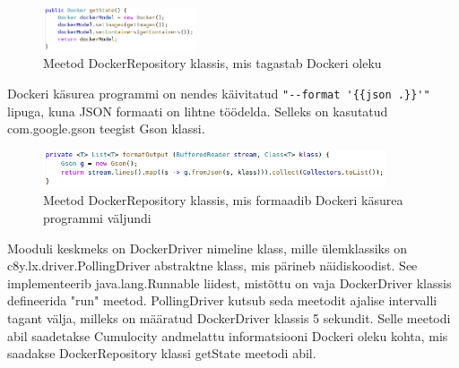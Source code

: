 \documentclass[12pt]{article}
\begin{document}
 \begin{figure} [ht] %
 \begin{center}
 \includegraphics[width=0.4\textwidth]{dockerdriver_repository_getstate}
 \caption{Meetod DockerRepository klassis, mis tagastab Dockeri oleku}
 \label{fig:dockerdriver_repository_getstate}
 \end{center}
 \end{figure}
 
 \FloatBarrier
 
 Dockeri käsurea programmi on nendes käivitatud \verb|"--format '{{json .}}'"| lipuga, kuna 
 JSON formaati on lihtne töödelda. Selleks on kasutatud com.google.gson teegist Gson klassi.

 \begin{figure} [ht] %
 \begin{center}
 \includegraphics[width=0.9\textwidth]{dockerdriver_repository_formatoutput}
 \caption{Meetod DockerRepository klassis, mis formaadib Dockeri käsurea programmi väljundi}
 \label{fig:dockerdriver_repository_formatoutput}
 \end{center}
 \end{figure}

 \FloatBarrier
 
 Mooduli keskmeks on DockerDriver nimeline klass, mille ülemklassiks on\newline
 c8y.lx.driver.PollingDriver abstraktne klass, mis pärineb näidiskoodist. See implementeerib
 java.lang.Runnable liidest, mistõttu on vaja DockerDriver klassis defineerida "run" meetod.
 PollingDriver kutsub seda meetodit ajalise intervalli tagant välja, milleks on
 määratud DockerDriver klassis 5 sekundit. Selle meetodi abil saadetakse Cumulocity
 andmelattu informatsiooni Dockeri oleku kohta, mis saadakse DockerRepository klassi
 getState meetodi abil.
\end{document}
